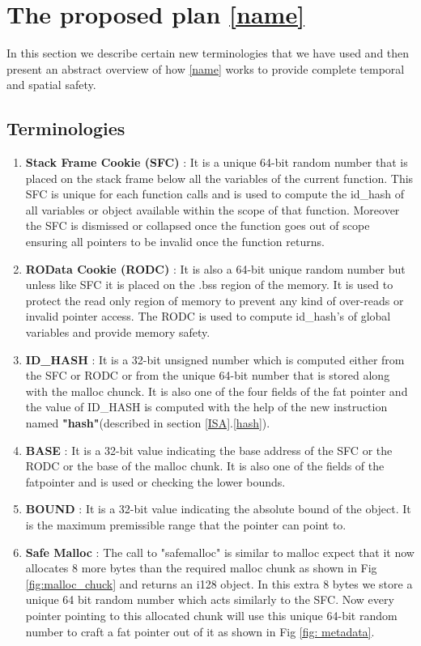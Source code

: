 \section{The proposed plan \ref{name}}
In this section we describe certain new terminologies that we have used and then present an abstract overview of how \ref{name} works to provide complete temporal and spatial safety. 
\subsection{Terminologies}\label{terms}
\begin{enumerate}
    \item \textbf{Stack Frame Cookie (SFC)}\label{SFC} : It is a unique 64-bit random number that is placed on the stack frame below all the variables of the current function. This SFC is unique for each function calls and is used to compute the id\_hash of all variables or object available within the scope of that function. Moreover the SFC is dismissed or collapsed once the function goes out of scope ensuring all pointers to be invalid once the function returns.
    \item \textbf{ROData Cookie (RODC)} : It is also a 64-bit unique random number but unless like SFC it is placed on the .bss region of the memory. It is used to protect the read only region of memory to prevent any kind of over-reads or invalid pointer access. The RODC is used to compute id\_hash's of global variables and provide memory safety.
    \item \textbf{ID\_HASH} : It is a 32-bit unsigned number which is computed either from the SFC or RODC or from the unique 64-bit number that is stored along with the malloc chunck. It is also one of the four fields of the fat pointer and the value of ID\_HASH is computed with the help of the new instruction named \textbf{"hash"}(described in section \ref{ISA}.\ref{hash}).
    \item \textbf{BASE} : It is a 32-bit value indicating the base address of the SFC or the RODC or the base of the malloc chunk. It is also one of the fields of the fatpointer and is used or checking the lower bounds.
    \item \textbf{BOUND} : It is a 32-bit value indicating the absolute bound of the object. It is the maximum premissible range that the pointer can point to. 
    \item \textbf{Safe Malloc}\label{safemalloc} : The call to "safemalloc" is similar to malloc expect that it now allocates 8 more bytes than the required malloc chunk as shown in Fig \ref{fig:malloc_chuck} and returns an i128 object. In this extra 8 bytes we store a unique 64 bit random number which acts similarly to the SFC. Now every pointer pointing to this allocated chunk will use this unique 64-bit random number to craft a fat pointer out of it as shown in Fig \ref{fig: metadata}.

\end{enumerate}
